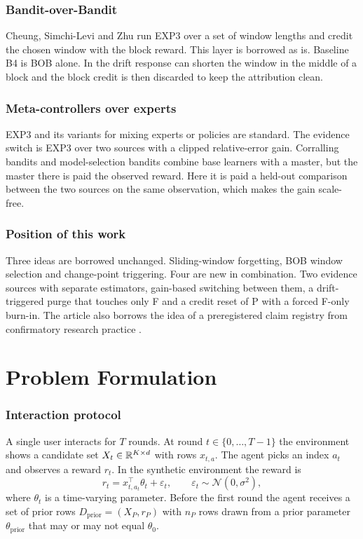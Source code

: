 \subsubsection*{Bandit-over-Bandit}
Cheung, Simchi-Levi and Zhu \cite{cheung2019} run EXP3 over a set of window lengths and credit the chosen window with the block reward. This layer is borrowed as is. Baseline B4 is BOB alone. In \des{} the drift response can shorten the window in the middle of a block and the block credit is then discarded to keep the attribution clean.

\subsubsection*{Meta-controllers over experts}
EXP3 \cite{auer2002} and its variants for mixing experts or policies are standard. The evidence switch is EXP3 over two sources with a clipped relative-error gain. Corralling bandits \cite{agarwal2017} and model-selection bandits \cite{pacchiano2020} combine base learners with a master, but the master there is paid the observed reward. Here it is paid a held-out comparison between the two sources on the same observation, which makes the gain scale-free.

\subsubsection*{Position of this work}
Three ideas are borrowed unchanged. Sliding-window forgetting, BOB window selection and change-point triggering. Four are new in combination. Two evidence sources with separate estimators, gain-based switching between them, a drift-triggered purge that touches only F and a credit reset of P with a forced F-only burn-in. The article also borrows the idea of a preregistered claim registry from confirmatory research practice \cite{nosek2018}.

\section{Problem Formulation}
\label{sec:problem}

\subsubsection*{Interaction protocol}
A single user interacts for $T$ rounds. At round $t\in\{0,\dots,T-1\}$ the environment shows a candidate set $X_t\in\mathbb{R}^{K\times d}$ with rows $x_{t,a}$. The agent picks an index $a_t$ and observes a reward $r_t$. In the synthetic environment the reward is
\begin{equation}
r_t = x_{t,a_t}^\top\theta_t + \varepsilon_t,\qquad \varepsilon_t\sim\mathcal N(0,\sigma^2),
\label{eq:reward}
\end{equation}
where $\theta_t$ is a time-varying parameter. Before the first round the agent receives a set of prior rows $D_{\mathrm{prior}}=(X_P,r_P)$ with $n_P$ rows drawn from a prior parameter $\theta_{\mathrm{prior}}$ that may or may not equal $\theta_0$.

